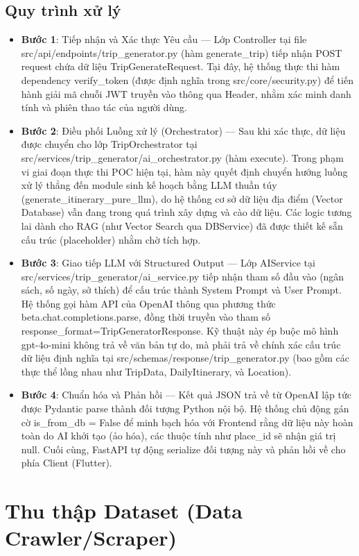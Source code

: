 \subsection{Quy trình xử lý}
\begin{itemize}
    \item \textbf{Bước 1}: Tiếp nhận và Xác thực Yêu cầu — Lớp Controller tại file src/api/endpoints/trip\_generator.py (hàm generate\_trip) tiếp nhận POST request chứa dữ liệu TripGenerateRequest. Tại đây, hệ thống thực thi hàm dependency verify\_token (được định nghĩa trong src/core/security.py) để tiến hành giải mã chuỗi JWT truyền vào thông qua Header, nhằm xác minh danh tính và phiên thao tác của người dùng.
    \item \textbf{Bước 2}: Điều phối Luồng xử lý (Orchestrator) — Sau khi xác thực, dữ liệu được chuyển cho lớp TripOrchestrator tại src/services/trip\_generator/ai\_orchestrator.py (hàm execute). Trong phạm vi giai đoạn thực thi POC hiện tại, hàm này quyết định chuyển hướng luồng xử lý thẳng đến module sinh kế hoạch bằng LLM thuần túy (generate\_itinerary\_pure\_llm), do hệ thống cơ sở dữ liệu địa điểm (Vector Database) vẫn đang trong quá trình xây dựng và cào dữ liệu. Các logic tương lai dành cho RAG (như Vector Search qua DBService) đã được thiết kế sẵn cấu trúc (placeholder) nhằm chờ tích hợp.
    \item \textbf{Bước 3}: Giao tiếp LLM với Structured Output — Lớp AIService tại src/services/trip\_generator/ai\_service.py tiếp nhận tham số đầu vào (ngân sách, số ngày, sở thích) để cấu trúc thành System Prompt và User Prompt. Hệ thống gọi hàm API của OpenAI thông qua phương thức beta.chat.completions.parse, đồng thời truyền vào tham số response\_format=TripGeneratorResponse. Kỹ thuật này ép buộc mô hình gpt-4o-mini không trả về văn bản tự do, mà phải trả về chính xác cấu trúc dữ liệu định nghĩa tại src/schemas/response/trip\_generator.py (bao gồm các thực thể lồng nhau như TripData, DailyItinerary, và Location).
    \item \textbf{Bước 4}: Chuẩn hóa và Phản hồi — Kết quả JSON trả về từ OpenAI lập tức được Pydantic parse thành đối tượng Python nội bộ. Hệ thống chủ động gán cờ is\_from\_db = False để minh bạch hóa với Frontend rằng dữ liệu này hoàn toàn do AI khởi tạo (ảo hóa), các thuộc tính như place\_id sẽ nhận giá trị null. Cuối cùng, FastAPI tự động serialize đối tượng này và phản hồi về cho phía Client (Flutter).
\end{itemize}

\section{Thu thập Dataset (Data Crawler/Scraper)}

